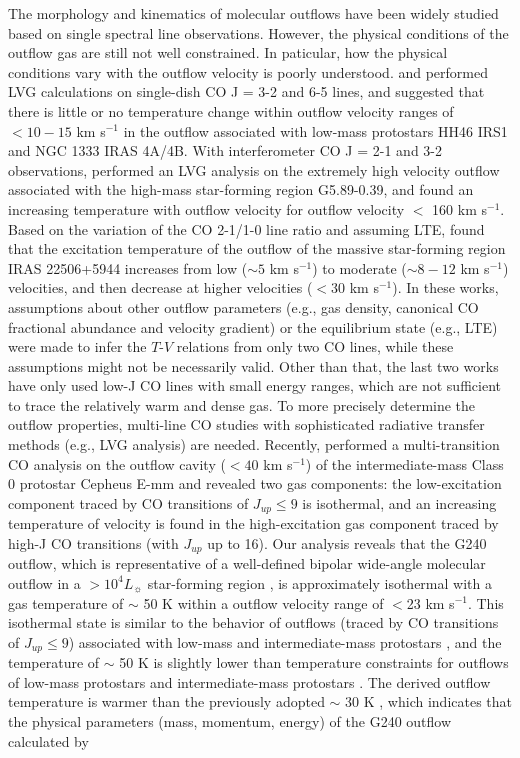 The morphology and kinematics of molecular outflows have been widely studied based on single spectral line observations. However, the physical conditions of the outflow gas are still not well constrained. In paticular, how the physical conditions vary with the outflow velocity is poorly understood. \citet{2009A&A...501..633V} and \citet{2012A&A...542A..86Y} performed LVG calculations on single-dish CO J = 3-2 and 6-5 lines, and suggested that there is little or no temperature change within outflow velocity ranges of $<10-15$ km s$^{-1}$ in the outflow associated with low-mass protostars HH46 IRS1 and NGC 1333 IRAS 4A/4B. With interferometer CO J = 2-1 and 3-2 observations, \citet{2012ApJ...744L..26S} performed an LVG analysis on the extremely high velocity outflow associated with the high-mass star-forming region G5.89-0.39, and found an increasing temperature with outflow velocity for outflow velocity $<$ 160 km s$^{-1}$. Based on the variation of the CO 2-1/1-0 line ratio and assuming LTE, \citet{2018RAA....18...19X} found that the excitation temperature of the outflow of the massive star-forming region IRAS 22506+5944 increases from low ($\sim 5$ km s$^{-1}$) to moderate ($\sim8-12$ km s$^{-1}$) velocities, and then decrease at higher velocities ($<30$ km s$^{-1}$). In these works, assumptions about other outflow parameters (e.g., gas density, canonical CO fractional abundance and velocity gradient) or the equilibrium state (e.g., LTE) were made to infer the $T$-$V$ relations from only two CO lines, while these assumptions might not be necessarily valid. Other than that, the last two works have only used low-J CO lines with small energy ranges, which are not sufficient to trace the relatively warm and dense gas. To more precisely determine the outflow properties, multi-line CO studies with sophisticated radiative transfer methods (e.g., LVG analysis) are needed. Recently, \citet{2015A&A...581A...4L} performed a multi-transition CO analysis on the outflow cavity ($<40$ km s$^{-1}$) of the intermediate-mass Class 0 protostar Cepheus E-mm and revealed two gas components: the low-excitation component traced by CO transitions of $J_{up} \le 9$ is isothermal, and an increasing temperature of velocity is found in the high-excitation gas component traced by high-J CO transitions (with $J_{up}$ up to 16). Our analysis reveals that the G240 outflow, which is representative of a well-defined bipolar wide-angle molecular outflow in a $> 10^4 L_\sun$ star-forming region \citep{2009ApJ...696...66Q}, is approximately isothermal with a gas temperature of $\sim$ 50 K within a outflow velocity range of $<$23 km s$^{-1}$. This isothermal state is similar to the behavior of outflows (traced by CO transitions of $J_{up} \le 9$) associated with low-mass and intermediate-mass protostars \citep{2012A&A...542A..86Y, 2015A&A...581A...4L}, and the temperature of $\sim$ 50 K is slightly lower than temperature constraints for outflows of low-mass protostars \citep{2009A&A...501..633V, 2012A&A...542A..86Y} and intermediate-mass protostars \citep{2016A&A...587A..17V}. The derived outflow temperature is warmer than the previously adopted $\sim$ 30 K \citep{2009ApJ...696...66Q}, which indicates that the physical parameters (mass, momentum, energy) of the G240 outflow calculated by 